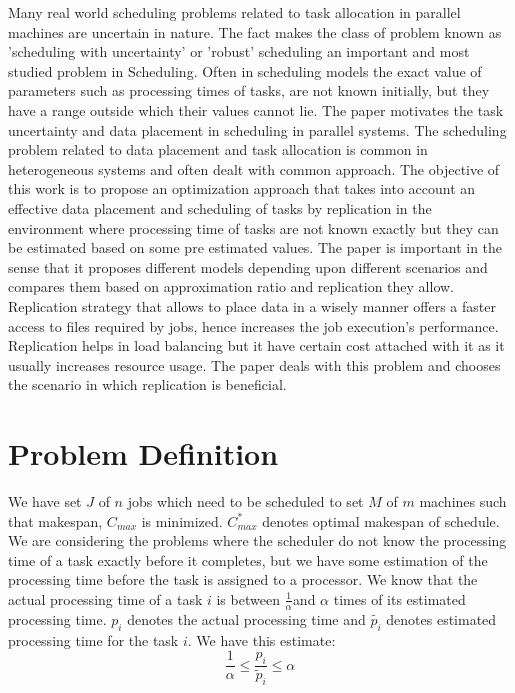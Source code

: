\documentclass[10pt, conference, compsocconf]{IEEEtran}
\begin{document}
Many real world scheduling problems related to task allocation in parallel machines are uncertain in nature. The fact makes the class of problem  known as 'scheduling with uncertainty' or 'robust' scheduling an important and most studied problem in Scheduling.  Often in  scheduling models the exact value of parameters such as processing times of tasks, are not known initially,   but they have a range outside which their values cannot  lie.  The paper motivates the task uncertainty and data placement in scheduling in parallel systems.  The scheduling problem related to data placement and task allocation is common in heterogeneous systems and often dealt with common approach.  The objective of this work is to propose an optimization approach that takes into account an effective data placement and scheduling of tasks by replication in the environment where processing time of tasks are not known exactly but they can be estimated based on some pre estimated values.  The paper is important in the sense that it proposes different models depending upon different scenarios and compares them based on approximation ratio and replication they allow.  Replication strategy that allows to place data in a wisely manner  offers a faster access to files required by  jobs, hence increases the job execution’s performance. Replication helps in load balancing but it have certain cost attached with it as it usually increases resource usage\cite{IEEEhowto:wang}.  The paper deals with this problem and chooses the scenario in which replication is beneficial.  




\section{Problem Definition}
We have set $J$ of $n$ jobs which need to be scheduled to set $M$ of $m$ machines such that makespan, $C_{max}$ is minimized.   $C_{max}^{*}$ denotes optimal makespan of schedule.   We are considering the problems where the scheduler do not know the processing time of a task exactly before it completes, but we have some estimation of the processing time before the task is assigned to a processor. We know that the actual processing time of a task $i$ is between $\frac{1}{\alpha}$and $\alpha$ times of its estimated processing time. $p_i$ denotes the actual processing time and $\tilde {p_i}$ denotes
estimated processing time for the task $i$.  We have this estimate:\\
\begin{equation} 
\frac{1}{\alpha}\leq \frac{p_{i}}{\tilde{p}_{i}}\leq \alpha
\end{equation}\\
\end{document}
